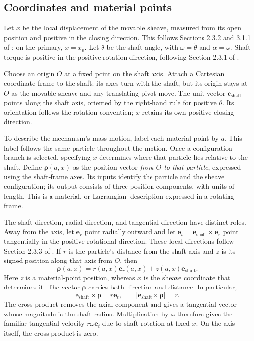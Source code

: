 \documentclass[11pt,letterpaper]{article}
\numberwithin{equation}{section}
\newcommand{\e}{\bm e_{\mathrm{shaft}}}
\newcommand{\rhoo}{\bm\rho}
\newcommand{\source}{\cite{formulation}}
\begin{document}
\subsection{Coordinates and material points}

Let $x$ be the local displacement of the movable sheave, measured from its open position and positive in the closing direction. This follows Sections 2.3.2 and 3.1.1 of \source; on the primary, $x=x_p$. Let $\theta$ be the shaft angle, with $\omega=\dot\theta$ and $\alpha=\dot\omega$. Shaft torque is positive in the positive rotation direction, following Section 2.3.1 of \source.

Choose an origin $O$ at a fixed point on the shaft axis. Attach a Cartesian coordinate frame to the shaft: its axes turn with the shaft, but its origin stays at $O$ as the movable sheave and any translating pivot move. The unit vector $\e$ points along the shaft axis, oriented by the right-hand rule for positive $\theta$. Its orientation follows the rotation convention; $x$ retains its own positive closing direction.

To describe the mechanism's mass motion, label each material point by $a$. This label follows the same particle throughout the motion. Once a configuration branch is selected, specifying $x$ determines where that particle lies relative to the shaft. Define $\rhoo(a,x)$ as the position vector \emph{from $O$ to that particle}, expressed using the shaft-frame axes. Its inputs identify the particle and the sheave configuration; its output consists of three position components, with units of length. This is a material, or Lagrangian, description expressed in a rotating frame.

The shaft direction, radial direction, and tangential direction have distinct roles. Away from the axis, let $\bm e_r$ point radially outward and let $\bm e_t=\e\times\bm e_r$ point tangentially in the positive rotational direction. These local directions follow Section 2.3.3 of \source. If $r$ is the particle's distance from the shaft axis and $z$ is its signed position along that axis from $O$, then
\begin{equation}
  \rhoo(a,x)=r(a,x)\bm e_r(a,x)+z(a,x)\e.
  \label{eq:position-components}
\end{equation}
Here $z$ is a material-point position, whereas $x$ is the sheave coordinate that determines it. The vector $\rhoo$ carries both direction and distance. In particular,
\begin{equation}
  \e\times\rhoo=r\bm e_t,
  \qquad |\e\times\rhoo|=r.
  \label{eq:shaft-cross-radius}
\end{equation}
The cross product removes the axial component and gives a tangential vector whose magnitude is the shaft radius. Multiplication by $\omega$ therefore gives the familiar tangential velocity $r\omega\bm e_t$ due to shaft rotation at fixed $x$. On the axis itself, the cross product is zero.
\end{document}
